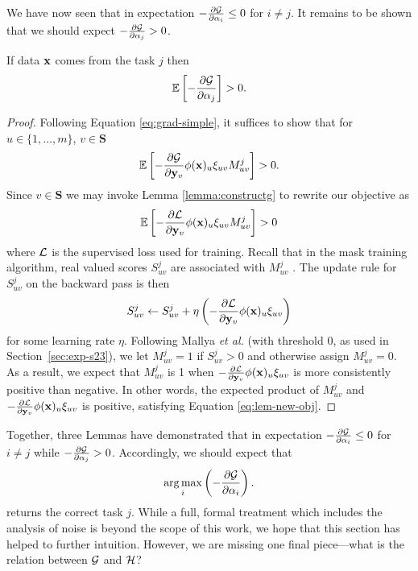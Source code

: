 \documentclass{article}
\DeclareMathOperator*{\argmax}{arg\,max}
\begin{document}
We have now seen that in expectation $-\frac{\partial \mathcal{G}}{\partial \alpha_i} \leq 0$ for $i \neq j$. It remains to be shown that we should expect $-\frac{\partial \mathcal{G}}{\partial \alpha_j} > 0$.

\begin{lemma}
If data $\mathbf{x}$ comes from the task $j$ then
\begin{align}
    \mathbb{E}\left\lbrack -\frac{\partial \mathcal{G}}{\partial \alpha_j} \right\rbrack > 0.
\end{align}
\begin{proof}
Following Equation \ref{eq:grad-simple}, it suffices to show that for $u \in \{1,...,m\}$, $v \in \mathbf{S}$
\begin{align} 
    \mathbb{E}\left\lbrack  -\frac{\partial \mathcal{G}}{\partial \mathbf{y}_v} \phi(\mathbf{x})_u   \xi_{uv} M_{uv}^j  \right\rbrack > 0.
\end{align}
Since $v \in \mathbf{S}$ we may invoke Lemma \ref{lemma:constructg} to rewrite our objective as
\begin{align} \label{eq:lem-new-obj}
    \mathbb{E}\left\lbrack - \frac{\partial \mathcal{L}}{\partial \mathbf{y}_v} \phi(\mathbf{x})_u   \xi_{uv} M_{uv}^j  \right\rbrack > 0
\end{align}
where $\mathcal{L}$ is the supervised loss used for training. Recall that in the mask training algorithm, real valued scores $S_{uv}^j$ are associated with $M_{uv}^j$ \cite{ramanujan2019s, mallya2018piggyback}. The update rule for $S_{uv}^j$ on the backward pass is then
\begin{align}
    S_{uv}^j \gets S_{uv}^j + \eta \left( - \frac{\partial \mathcal{L}}{\partial \mathbf{y}_v} \phi(\mathbf{x})_u   \xi_{uv}  \right)
\end{align}
for some learning rate $\eta$. Following Mallya \textit{et al.} \cite{mallya2018piggyback} (with threshold 0, as used in Section~\ref{sec:exp-s23}), we let $M_{uv}^j=1$ if $S_{uv}^j > 0$ and otherwise assign $M_{uv}^j=0$. As a result, we expect that $M_{uv}^j$ is 1 when $- \frac{\partial \mathcal{L}}{\partial \mathbf{y}_v} \phi(\mathbf{x})_u   \xi_{uv} $ is more consistently positive than negative. In other words, the expected product of $M_{uv}^j$ and $- \frac{\partial \mathcal{L}}{\partial \mathbf{y}_v} \phi(\mathbf{x})_u   \xi_{uv} $ is positive, satisfying Equation \ref{eq:lem-new-obj}.
\end{proof}
\end{lemma}
Together, three Lemmas have demonstrated that in expectation $-\frac{\partial \mathcal{G}}{\partial \alpha_i} \leq 0$ for $i \neq j$ while $-\frac{\partial \mathcal{G}}{\partial \alpha_j} > 0$. Accordingly, we should expect that
\begin{align}
\argmax_i  \round{ -\frac{\partial \Gcal}{\partial \alpha_i} }.
\end{align}
returns the correct task $j$. While a full, formal treatment which includes the analysis of noise is beyond the scope of this work, we hope that this section has helped to further intuition. However, we are missing one final piece---what is the relation between $\mathcal{G}$ and $\mathcal{H}$?
\end{document}
